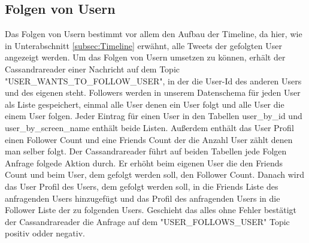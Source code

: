 \subsection{Folgen von Usern}
Das Folgen von Usern bestimmt vor allem den Aufbau der Timeline, da hier, wie in Unterabschnitt \ref{subsec:Timeline} erwähnt, alle Tweets der gefolgten User angezeigt werden. Um das Folgen von Usern umsetzen zu können, erhält der Cassandrareader einer Nachricht auf dem Topic "USER\_WANTS\_TO\_FOLLOW\_USER", in der die User-Id des anderen Users und des eigenen steht. Followers werden in unserem Datenschema für jeden User als Liste gespeichert, einmal alle User denen ein User folgt und alle User die einem User folgen. Jeder Eintrag für einen User in den Tabellen user\_by\_id und user\_by\_screen\_name enthält beide Listen. Außerdem enthält das User Profil einen Follower Count und eine Friends Count der die Anzahl User zählt denen man selber folgt. Der Cassandrareader führt auf beiden Tabellen jede Folgen Anfrage folgede Aktion durch. Er erhöht beim eigenen User die den Friends Count und beim User, dem gefolgt werden soll, den Follower Count. Danach wird das User Profil des Users, dem gefolgt werden soll, in die Friends Liste des anfragenden Users hinzugefügt und das Profil des anfragenden Users in die Follower Liste der zu folgenden Users. Geschieht das alles ohne Fehler bestätigt der Cassandrareader die Anfrage auf dem "USER\_FOLLOWS\_USER" Topic positiv odder negativ.
